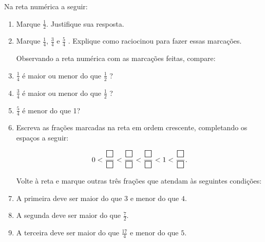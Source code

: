 Na reta numérica a seguir:
\begin{enumerate} [\quad a)] %
  \item     Marque     $\frac{1}{2}$. Justifique sua resposta.
  \item     Marque     $\frac{1}{4}$,     $\frac{3}{4}$     e     $\frac{5}{4}$    . Explique como raciocinou para fazer essas marcações.

\begin{center}
\end{center}

Observando a reta numérica com as marcações feitas, compare:

  \item $\frac{1}{4}$     é maior ou menor do que     $\frac{1}{2}$    ?
  \item $\frac{3}{4}$ é maior ou menor do que $\frac{1}{2}$    ?
  \item $\frac{5}{4}$  é menor do que 1?
  \item Escreva as frações marcadas na reta em ordem crescente, completando os espaços a seguir:

$$0 <  \dfrac{\text{\Large $\square$}}{\text{\Large $\square$}} <  \dfrac{\text{\Large $\square$}}{\text{\Large $\square$}} < \dfrac{\text{\Large $\square$}}{\text{\Large $\square$}} < 1 < \dfrac{\text{\Large $\square$}}{\text{\Large $\square$}}.$$

Volte à reta e marque outras três frações que atendam às seguintes condições:
  \item A primeira deve ser maior do que $3$ e menor do que $4$.
 \item A segunda deve ser maior do que $\frac{7}{2}$.
 \item A terceira deve ser maior do que $\frac{17}{4}$ e menor do que $5$.

\end{enumerate} %


